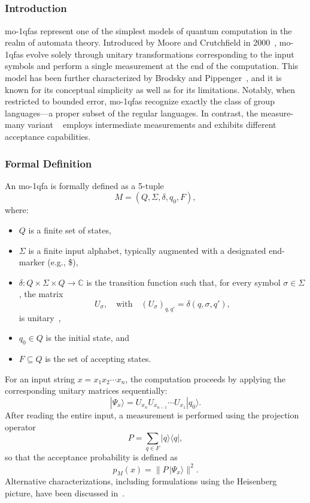 \subsection{}
\label{sec:moqfa}

\subsubsection{Introduction}
\glspl{mo-1qfa} represent one of the simplest models of quantum computation in the realm of automata theory. Introduced by Moore and Crutchfield in 2000~\cite{moore2000quantum}, \glspl{mo-1qfa} evolve solely through unitary transformations corresponding to the input symbols and perform a single measurement at the end of the computation. This model has been further characterized by Brodsky and Pippenger~\cite{brodsky2002characterizations}, and it is known for its conceptual simplicity as well as for its limitations. Notably, when restricted to bounded error, \glspl{mo-1qfa} recognize exactly the class of group languages—a proper subset of the regular languages. In contrast, the measure-many variant ~\cite{kondacs1997power} employs intermediate measurements and exhibits different acceptance capabilities.

\subsubsection{Formal Definition}
An \gls{mo-1qfa} is formally defined as a 5-tuple 
\[
M = (Q,\Sigma,\delta,q_0,F),
\]
where:
\begin{itemize}
    \item $Q$ is a finite set of states,
    \item $\Sigma$ is a finite input alphabet, typically augmented with a designated end-marker (e.g., \$),
    \item $\delta : Q \times \Sigma \times Q \to \mathbb{C}$ is the transition function such that, for every symbol $\sigma\in\Sigma$, the matrix 
    \[
    U_\sigma,\quad \text{with} \quad (U_\sigma)_{q,q'} = \delta(q,\sigma,q'),
    \]
    is unitary~\cite{moore2000quantum},
    \item $q_0 \in Q$ is the initial state, and
    \item $F\subseteq Q$ is the set of accepting states.
\end{itemize}
For an input string $x=x_1x_2\cdots x_n$, the computation proceeds by applying the corresponding unitary matrices sequentially:
\[
|\Psi_x\rangle = U_{x_n}U_{x_{n-1}}\cdots U_{x_1}|q_0\rangle.
\]
After reading the entire input, a measurement is performed using the projection operator
\[
P=\sum_{q\in F} |q\rangle\langle q|,
\]
so that the acceptance probability is defined as
\[
p_M(x)=\|P\,|\Psi_x\rangle\|^2.
\]
Alternative characterizations, including formulations using the Heisenberg picture, have been discussed in~\cite{qiu2004characterizations,piazza2022mirrors}.

